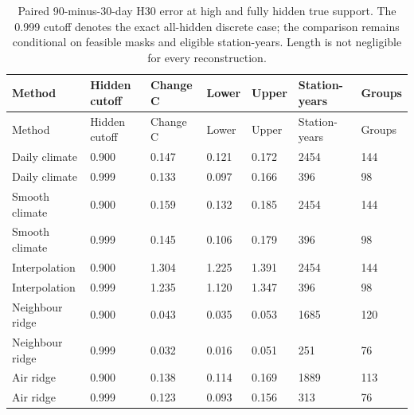 {\tabletext
\setlength{\tabcolsep}{3pt}
\begin{longtable}{p{}p{}p{}p{}p{}p{}p{}}
\caption{Paired 90-minus-30-day H30 error at high and fully hidden true support. The 0.999 cutoff denotes the exact all-hidden discrete case; the comparison remains conditional on feasible masks and eligible station-years. Length is not negligible for every reconstruction.}\label{tab:r3si-length}\\
\toprule
Method & Hidden cutoff & Change C & Lower & Upper & Station-years & Groups \\
\midrule
\endfirsthead
\toprule
Method & Hidden cutoff & Change C & Lower & Upper & Station-years & Groups \\
\midrule
\endhead
Daily climate & 0.900 & 0.147 & 0.121 & 0.172 & 2454 & 144 \\
Daily climate & 0.999 & 0.133 & 0.097 & 0.166 & 396 & 98 \\
Smooth climate & 0.900 & 0.159 & 0.132 & 0.185 & 2454 & 144 \\
Smooth climate & 0.999 & 0.145 & 0.106 & 0.179 & 396 & 98 \\
Interpolation & 0.900 & 1.304 & 1.225 & 1.391 & 2454 & 144 \\
Interpolation & 0.999 & 1.235 & 1.120 & 1.347 & 396 & 98 \\
Neighbour ridge & 0.900 & 0.043 & 0.035 & 0.053 & 1685 & 120 \\
Neighbour ridge & 0.999 & 0.032 & 0.016 & 0.051 & 251 & 76 \\
Air ridge & 0.900 & 0.138 & 0.114 & 0.169 & 1889 & 113 \\
Air ridge & 0.999 & 0.123 & 0.093 & 0.156 & 313 & 76 \\
\bottomrule
\end{longtable}
}

